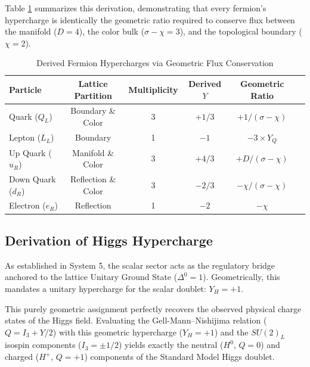 Table \ref{tab:hypercharge_derivation} summarizes this derivation, demonstrating that every fermion's hypercharge is identically the geometric ratio required to conserve flux between the manifold ($D=4$), the color bulk ($\sigma-\chi=3$), and the topological boundary ($\chi=2$).

\begin{table}[ht!]
\centering
\caption{Derived Fermion Hypercharges via Geometric Flux Conservation}
\label{tab:hypercharge_derivation}
\renewcommand{\arraystretch}{1.2}
\begin{tabular}{@{}lccccc@{}}
\toprule
\textbf{Particle} & \textbf{Lattice Partition} & \textbf{Multiplicity} & \textbf{Derived $Y$} & \textbf{Geometric Ratio} \\
\midrule
Quark ($Q_L$)    & Boundary \& Color & 3 & $+1/3$ & $+1/(\sigma-\chi)$ \\
Lepton ($L_L$)   & Boundary & 1 & $-1$ & $-3 \times Y_Q$ \\
\addlinespace
Up Quark ($u_R$)    & Manifold \& Color & 3 & $+4/3$ & $+D/(\sigma-\chi)$ \\
Down Quark ($d_R$)  & Reflection \& Color & 3 & $-2/3$ & $-\chi/(\sigma-\chi)$ \\
Electron ($e_R$)    & Reflection & 1 & $-2$ & $-\chi$ \\
\bottomrule
\end{tabular}
\end{table}

\subsection{Derivation of Higgs Hypercharge}
As established in System 5, the scalar sector acts as the regulatory bridge anchored to the lattice Unitary Ground State ($\Delta^0 = 1$). Geometrically, this mandates a unitary hypercharge for the scalar doublet: $Y_H = +1$. 

This purely geometric assignment perfectly recovers the observed physical charge states of the Higgs field. Evaluating the Gell-Mann--Nishijima relation ($Q = I_3 + Y/2$) with this geometric hypercharge ($Y_H = +1$) and the $SU(2)_L$ isospin components ($I_3 = \pm 1/2$) yields exactly the neutral ($H^0$, $Q=0$) and charged ($H^+$, $Q=+1$) components of the Standard Model Higgs doublet.